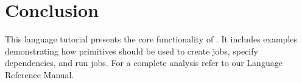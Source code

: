 \section{Conclusion}
\label{sect:conclusion}
This language tutorial presents the core functionality of \lang{}. It includes examples
demonstrating how \lang{} primitives should be used to create jobs, specify dependencies, and run
jobs. For a complete analysis refer to our Language Reference Manual.
